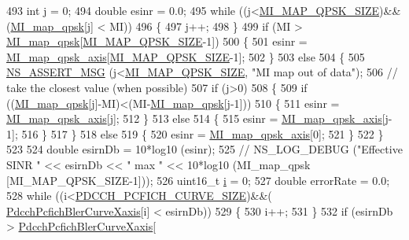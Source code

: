 \begin{DoxyCode}
493   \textcolor{keywordtype}{int} j = 0;
494   \textcolor{keywordtype}{double} esinr = 0.0;
495   \textcolor{keywordflow}{while} ((j<\hyperlink{namespacens3_aae59b755610c3c0be0b839e4dcc933d6}{MI\_MAP\_QPSK\_SIZE})&&(\hyperlink{namespacens3_a033a4853fbafa2f0685cfc40fafedac1}{MI\_map\_qpsk}[j] < MI))
496     \{
497       j++;
498     \}
499   \textcolor{keywordflow}{if} (MI > \hyperlink{namespacens3_a033a4853fbafa2f0685cfc40fafedac1}{MI\_map\_qpsk}[\hyperlink{namespacens3_aae59b755610c3c0be0b839e4dcc933d6}{MI\_MAP\_QPSK\_SIZE}-1])
500     \{
501       esinr = \hyperlink{namespacens3_a8170078bba1537f2165fdd97e9a49d0f}{MI\_map\_qpsk\_axis}[\hyperlink{namespacens3_aae59b755610c3c0be0b839e4dcc933d6}{MI\_MAP\_QPSK\_SIZE}-1];
502     \}
503   \textcolor{keywordflow}{else} 
504     \{
505       \hyperlink{assert_8h_aff5ece9066c74e681e74999856f08539}{NS\_ASSERT\_MSG} (j<\hyperlink{namespacens3_aae59b755610c3c0be0b839e4dcc933d6}{MI\_MAP\_QPSK\_SIZE}, \textcolor{stringliteral}{"MI map out of data"});
506       \textcolor{comment}{// take the closest value (when possible)  }
507       \textcolor{keywordflow}{if} (j>0)
508         \{
509           \textcolor{keywordflow}{if} ((\hyperlink{namespacens3_a033a4853fbafa2f0685cfc40fafedac1}{MI\_map\_qpsk}[j]-MI)<(MI-\hyperlink{namespacens3_a033a4853fbafa2f0685cfc40fafedac1}{MI\_map\_qpsk}[j-1]))
510             \{
511               esinr = \hyperlink{namespacens3_a8170078bba1537f2165fdd97e9a49d0f}{MI\_map\_qpsk\_axis}[j];
512             \}
513           \textcolor{keywordflow}{else}
514             \{
515               esinr = \hyperlink{namespacens3_a8170078bba1537f2165fdd97e9a49d0f}{MI\_map\_qpsk\_axis}[j-1];
516             \}
517         \}
518       \textcolor{keywordflow}{else}
519         \{
520           esinr = \hyperlink{namespacens3_a8170078bba1537f2165fdd97e9a49d0f}{MI\_map\_qpsk\_axis}[0];
521         \}
522     \}
523 
524   \textcolor{keywordtype}{double} esirnDb = 10*log10 (esinr); 
525 \textcolor{comment}{//   NS\_LOG\_DEBUG ("Effective SINR " << esirnDb << " max " << 10*log10 (MI\_map\_qpsk [MI\_MAP\_QPSK\_SIZE-1]));}
526   uint16\_t \hyperlink{bernuolliDistribution_8m_a6f6ccfcf58b31cb6412107d9d5281426}{i} = 0;
527   \textcolor{keywordtype}{double} errorRate = 0.0;
528   \textcolor{keywordflow}{while} ((i<\hyperlink{namespacens3_a2e25e67eb717794919aef954cb72766e}{PDCCH\_PCFICH\_CURVE\_SIZE})&&(
      \hyperlink{namespacens3_a0df485462fa037261fab008e59dea088}{PdcchPcfichBlerCurveXaxis}[i] < esirnDb))
529     \{
530       i++;
531     \}
532   \textcolor{keywordflow}{if} (esirnDb > \hyperlink{namespacens3_a0df485462fa037261fab008e59dea088}{PdcchPcfichBlerCurveXaxis}[

\end{DoxyCode}
